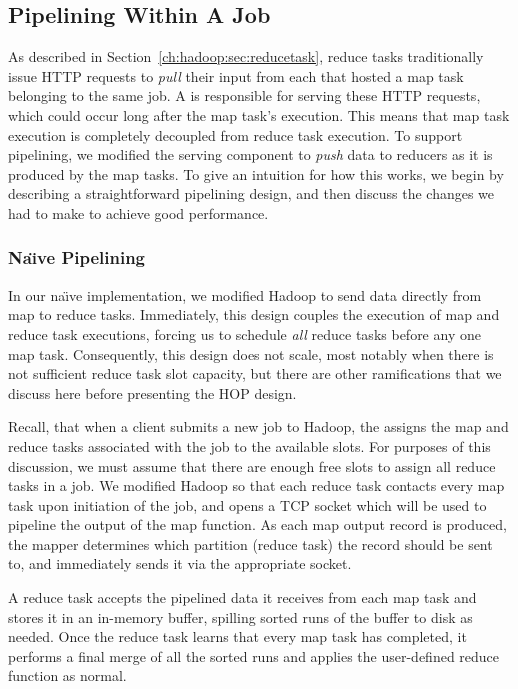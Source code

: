 \subsection{Pipelining Within A Job}
\label{ch:hop:sec:intra-pipe}

As described in Section~\ref{ch:hadoop:sec:reducetask}, reduce tasks
traditionally issue HTTP requests to \emph{pull} their input from each {\TT}
that hosted a map task belonging to the same job.  A \TT is responsible for
serving these HTTP requests, which could occur long after the map task's
execution.  This means that map task execution is completely decoupled from
reduce task execution.  To support pipelining, we modified the \TT serving
component to \emph{push} data to reducers as it is produced by the map tasks.
To give an intuition for how this works, we begin by describing a
straightforward pipelining design, and then discuss the changes we had to make
to achieve good performance.

\subsubsection{Na\"{\i}ve Pipelining}
\label{ch:hop:sec:naive}

In our na\"{\i}ve implementation, we modified Hadoop to send data directly from
map to reduce tasks.  Immediately, this design couples the execution of map and
reduce task executions, forcing us to schedule {\em all} reduce tasks before
any one map task.  Consequently, this design does not scale, most notably when
there is not sufficient reduce task slot capacity, but there are other
ramifications that we discuss here before presenting the HOP design.

Recall, that when a client submits a new job to Hadoop, the {\JT} assigns the
map and reduce tasks associated with the job to the available {\TT} slots.  For
purposes of this discussion, we must assume that there are enough free slots to
assign all reduce tasks in a job.  We modified Hadoop so that each reduce task
contacts every map task upon initiation of the job, and opens a TCP socket
which will be used to pipeline the output of the map function.  As each map
output record is produced, the mapper determines which partition (reduce task)
the record should be sent to, and immediately sends it via the appropriate
socket.

A reduce task accepts the pipelined data it receives from each map task and
stores it in an in-memory buffer, spilling sorted runs of the buffer to disk as
needed. Once the reduce task learns that every map task has completed, it
performs a final merge of all the sorted runs and applies the user-defined
reduce function as normal.


